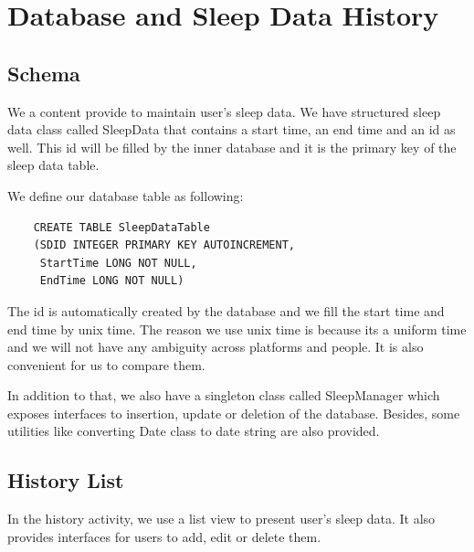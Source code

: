\documentclass[14pt]{extreport}
\begin{document}
\chapter{Database and Sleep Data History}

\section{Schema}
We a content provide to maintain user's sleep data. We have structured sleep data class called SleepData that contains a start time, an end time and an id as well. This id will be filled by the inner database and it is the primary key of the sleep data table.

We define our database table as following:
\begin{verbatim}
    CREATE TABLE SleepDataTable
    (SDID INTEGER PRIMARY KEY AUTOINCREMENT, 
     StartTime LONG NOT NULL,
     EndTime LONG NOT NULL)
\end{verbatim}
The id is automatically created by the database and we fill the start time and end time by unix time. The reason we use unix time is because its a uniform time and we will not have any ambiguity across platforms and people. It is also convenient for us to compare them.

In addition to that, we also have a singleton class called SleepManager which exposes interfaces to insertion, update or deletion of the database. Besides, some utilities like converting Date class to date string are also provided.

\section{History List}
In the history activity, we use a list view to present user's sleep data. It also provides interfaces for users to add, edit or delete them.
\end{document}
